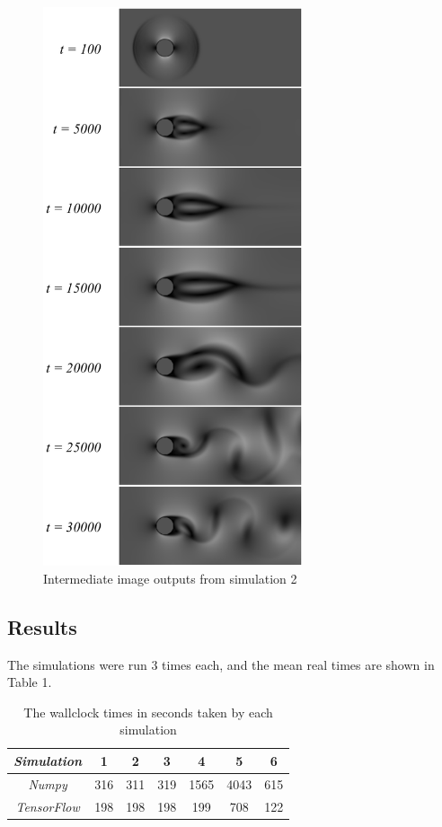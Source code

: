 \documentclass{article}
\begin{document}
\begin{figure}[H] 
	\centering
	\label{videoCuts}
	\includegraphics[width=3in]{Diagrams/CylinderFlowImages.png}
	\caption{Intermediate image outputs from simulation 2}
\end{figure}

\subsection{Results}

The simulations were run 3 times each, and the mean real times are shown in Table 1. 

\begin{table}[H]
\caption{The wallclock times in seconds taken by each simulation}
\begin{center}
\begin{tabular}{c||c|c|c|c|c|c}
\emph{Simulation} & 1 & 2 & 3 & 4 & 5 & 6\\
\hline
\hline
\emph{Numpy} & 316 & 311 & 319 & 1565 & 4043 & 615 \\
\hline
\emph{TensorFlow} & 198 & 198 & 198 & 199 & 708 & 122 \\
\hline
\end{tabular}
\end{center}
\end{table}
\end{document}
